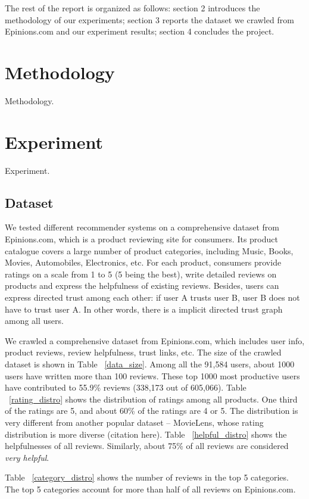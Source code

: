 \documentclass[12pt]{article}
\begin{document}
The rest of the report is organized as follows: section 2 introduces the methodology of our experiments; section 3 reports the dataset we crawled from Epinions.com and our experiment results; section 4 concludes the project. 

\section{Methodology}
Methodology.
\section{Experiment}
Experiment.
\subsection{Dataset}
We tested different recommender systems on a comprehensive dataset from Epinions.com, which is a product reviewing site for consumers. Its product catalogue covers a large number of product categories, including Music, Books, Movies, Automobiles, Electronics, etc. For each product, consumers provide ratings on a scale from 1 to 5 (5 being the best), write detailed reviews on products and express the helpfulness of existing reviews. Besides, users can express directed trust among each other: if user A trusts user B, user B does not have to trust user A. In other words, there is a implicit directed trust graph among all users. 

We crawled a comprehensive dataset from Epinions.com, which includes user info, product reviews, review helpfulness, trust links, etc. The size of the crawled dataset is shown in Table ~\ref{data_size}. Among all the 91,584 users, about 1000 users have written more than 100 reviews. These top 1000 most productive users have contributed to 55.9\% reviews (338,173 out of 605,066).  Table ~\ref{rating_distro} shows the distribution of ratings among all products. One third of the ratings are 5, and about 60\% of the ratings are 4 or 5. The distribution is very different from another popular dataset -- MovieLens, whose rating distribution is more diverse (citation here). Table ~\ref{helpful_distro} shows the helpfulnesses of all reviews. Similarly, about 75\% of all reviews are considered \emph{very helpful}. 

Table ~\ref{category_distro} shows the number of reviews in the top 5 categories. The top 5 categories account for more than half of all reviews on Epinions.com.
\end{document}
